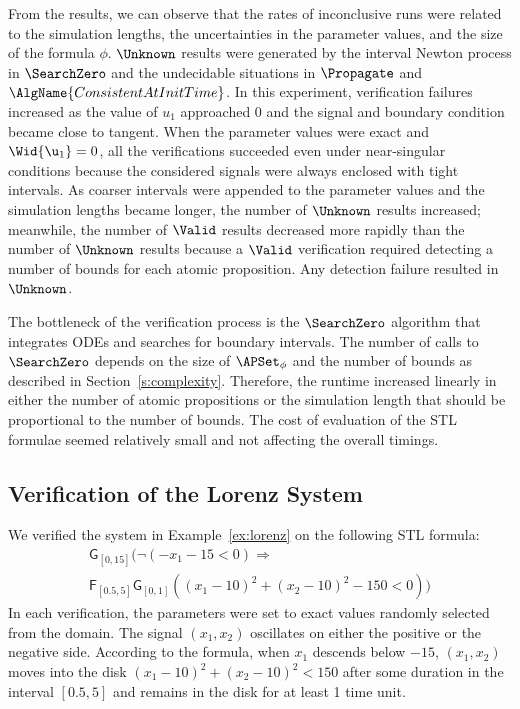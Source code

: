 \documentclass[paper]{ieice}
\newcommand{\Always}{\mathsf{G}}
\newcommand{\Eventually}{\mathsf{F}}
\begin{document}
From the results, we can observe that the rates of inconclusive runs were related to the simulation lengths, the uncertainties in the parameter values, and the size of the formula $\phi$.
$\Unknown$ results were generated by the interval Newton process in $\SearchZero$ and the undecidable situations in $\Propagate$ and $\AlgName{ConsistentAtInitTime}$. In this experiment, verification failures increased as the value of $u_1$ approached 0 and the signal and boundary condition became close to tangent.
When the parameter values were exact and $\Wid{\u_1} = 0$, all the verifications succeeded even under near-singular conditions because the considered signals were always enclosed with tight intervals.
As coarser intervals were appended to the parameter values and the simulation lengths became longer, the number of $\Unknown$ results increased; meanwhile, the number of $\Valid$ results decreased more rapidly than the number of $\Unknown$ results because a $\Valid$ verification required detecting a number of bounds for each atomic proposition. Any detection failure resulted in $\Unknown$.

The bottleneck of the verification process is the $\SearchZero$ algorithm that integrates ODEs and searches for boundary intervals. The number of calls to $\SearchZero$ depends on the size of $\APSet_\phi$ and the number of bounds as described in Section~\ref{s:complexity}.
Therefore, the runtime increased linearly in either the number of atomic propositions or the simulation length that should be proportional to the number of bounds.
The cost of evaluation of the STL formulae seemed relatively small and not affecting the overall timings.


\subsection{Verification of the Lorenz System}

We verified the system in Example~\ref{ex:lorenz} on the following STL formula:
\begin{multline} \label{e:lorenz}
	\Always_{[0,15]} (\neg(-x_1-15<0) \Rightarrow \\
	\Eventually_{[0.5,5]} \Always_{[0,1]} ((x_1\!-\!10)^2 \!+\! (x_2\!-\!10)^2 \!-\! 150<0))
\end{multline}
In each verification, the parameters were set to exact values randomly selected from the domain.
The signal $(x_1, x_2)$ oscillates on either the positive or the negative side. According to the formula, when $x_1$ descends below $-15$, $(x_1,x_2)$ moves into the disk $(x_1-10)^2+(x_2-10)^2 <150$ after some duration in the interval $[0.5,5]$ and remains in the disk for at least 1 time unit.
\end{document}
